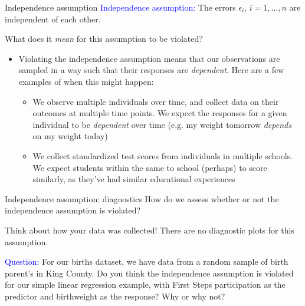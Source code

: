 \documentclass[10pt,t]{beamer}
\begin{document}
\begin{frame}{Independence assumption}
\textcolor{blue}{Independence assumption:} The errors $\epsilon_i$, $i = 1, \dots, n$ are independent of each other.

\vspace{0.3cm}

What does it \textit{mean} for this assumption to be violated?

\vspace{0.3cm}

\begin{itemize}
	\item[] Violating the independence assumption means that our observations are sampled in a way such that their responses are \textit{dependent}. Here are a few examples of when this might happen:
	\begin{itemize}
		\item We observe multiple individuals over time, and collect data on their outcomes at multiple time points. We expect the responses for a given individual to be \textit{dependent} over time (e.g. my weight tomorrow \textit{depends} on my weight today)
		\item We collect standardized test scores from individuals in multiple schools. We expect students within the same to school (perhaps) to score similarly, as they've had similar educational experiences
	\end{itemize}
\end{itemize}
\end{frame}

\begin{frame}{Independence assumption: diagnostics}
How do we assess whether or not the independence assumption is violated?

\vspace{0.3cm}

Think about how your data was collected! There are no diagnostic plots for this assumption.

\vspace{0.3cm}

\textcolor{blue}{Question:} For our births dataset, we have data from a random sample of birth parent's in King County. Do you think the independence assumption is violated for our simple linear regression example, with First Steps participation as the predictor and birthweight as the response? Why or why not?

\end{frame}
\end{document}
